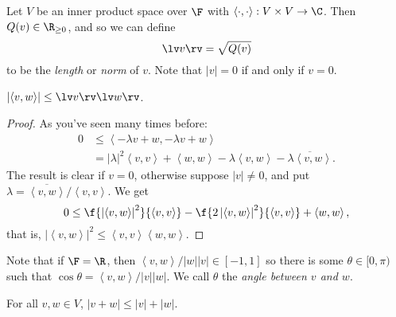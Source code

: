\begin{definition}
	Let $V$ be an inner product space over $\F$ with $\left\langle \cdot,\cdot \right\rangle: V\times V\to\C$. Then $Q(v) \in \R_{\geq0}$, and so we can define %
	\begin{equation*}
		\lv v \rv = {\sqrt{Q(v)}}
	\end{equation*}
	to be the \emph{length} or \emph{norm} of $v$. Note that $\left\vert v \right\vert=0$ if and only if $v=0$. %
\end{definition}

\begin{lemma}
	 $\left\vert \left\langle v,w \right\rangle \right\vert \leq \lv v \rv \lv w \rv$. %
\end{lemma}

\begin{proof}
	As you've seen many times before: %
	\begin{align*}
		0
		&\leq \left\langle -\lambda v+w, -\lambda v+w \right\rangle \\
		&= \left\vert \lambda \right\vert^2 \left\langle v,v \right\rangle + \left\langle w,w \right\rangle - \lambda \left\langle v,w \right\rangle - \overline{\lambda \left\langle v,w \right\rangle}. %
	\end{align*}
	The result is clear if $v=0$, otherwise suppose $\left\vert v \right\vert\neq 0$, and put $\lambda=\overline{\left\langle v,w \right\rangle}/\left\langle v,v \right\rangle$. We get %
	\begin{equation*}
		0\leq \f{\left\vert \left\langle v,w \right\rangle \right\vert^2}{\left\langle v,v \right\rangle} - \f{2\left\vert \left\langle v,w \right\rangle \right\vert^2}{\left\langle v,v \right\rangle} + \left\langle w,w \right\rangle, %
	\end{equation*}
	that is, $\left\vert \left\langle v,w \right\rangle \right\vert^2 \leq  \left\langle v,v \right\rangle \left\langle w,w \right\rangle$. %
\end{proof}

Note that if $\F=\R$, then $\left\langle v,w \right\rangle/\left\vert w \right\vert\left\vert v \right\vert\in[-1,1]$ so there is some $\theta\in[0,\pi)$ such that $\cos\theta=\left\langle v,w \right\rangle/\left\vert v \right\vert\left\vert w \right\vert$. We call $\theta$ the \emph{angle between $v$ and $w$}.

	\pagebreak

\begin{corollary}
	 For all $v,w\in V$, $\left\vert v+w \right\vert\leq \left\vert v \right\vert+\left\vert w \right\vert$. %
\end{corollary}

